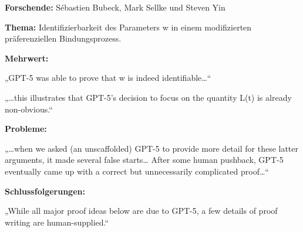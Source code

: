\documentclass[
  ngerman,
  letterpaper,
  DIV=11]{scrreprt}
\begin{document}
\begin{tcolorbox}[enhanced jigsaw, left=2mm, bottomrule=.15mm, arc=.35mm, rightrule=.15mm, colframe=quarto-callout-note-color-frame, coltitle=black, colback=white, toprule=.15mm, toptitle=1mm, colbacktitle=quarto-callout-note-color!10!white, title=\textcolor{quarto-callout-note-color}{\faInfo}\hspace{0.5em}{Mathematik / Lerntheorie: Dynamische Netzwerke}, opacitybacktitle=0.6, leftrule=.75mm, bottomtitle=1mm, titlerule=0mm, opacityback=0, breakable]

\textbf{Forschende:} Sébastien Bubeck, Mark Sellke und Steven Yin

\textbf{Thema:} Identifizierbarkeit des Parameters w in einem
modifizierten präferenziellen Bindungsprozess.

\textbf{Mehrwert:}

„GPT-5 was able to prove that w is indeed identifiable\ldots``

„\ldots this illustrates that GPT-5's decision to focus on the quantity
L(t) is already non-obvious.``

\textbf{Probleme:}

„\ldots when we asked (an unscaffolded) GPT-5 to provide more detail for
these latter arguments, it made several false starts\ldots{} After some
human pushback, GPT-5 eventually came up with a correct but
unnecessarily complicated proof\ldots``

\textbf{Schlussfolgerungen:}

„While all major proof ideas below are due to GPT-5, a few details of
proof writing are human-supplied.``

\end{tcolorbox}
\end{document}
